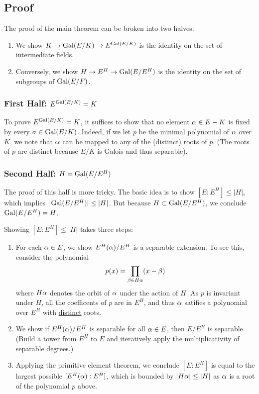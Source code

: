 \subsection{Proof}
The proof of the main theorem can be broken into two halves:
\begin{enumerate}
    \item We show $K \rightarrow \operatorname{Gal}(E/K) \rightarrow E^{\operatorname{Gal}(E/K)}$ is the identity on the set of intermediate fields.
    \item Conversely, we show $H \rightarrow E^H \rightarrow \operatorname{Gal}(E/E^H)$ is the identity on the set of subgroups of $\operatorname{Gal}(E/F)$.
\end{enumerate}

\subsubsection{First Half: $E^{\operatorname{Gal}(E/K)} = K$}
To prove $E^{\operatorname{Gal}(E/K)} = K$, it suffices to show that no element $\alpha \in E-K$ is fixed by every $\sigma \in \operatorname{Gal}(E/K)$. Indeed, if we let $p$ be the minimal polynomial of $\alpha$ over $K$, we note that $\alpha$ can be mapped to any of the (distinct) roots of $p$. (The roots of $p$ are distinct because $E/K$ is Galois and thus separable).

\subsubsection{Second Half: $H = \operatorname{Gal}(E/E^H)$}
The proof of this half is more tricky. The basic idea is to show $[E : E^H] \leq |H|$, which implies $|\operatorname{Gal}(E/E^H)| \leq |H|$. But because $H \subset \operatorname{Gal}(E/E^H)$, we conclude $\operatorname{Gal}(E/E^H) = H$.

Showing $[E : E^H] \leq |H|$ takes three steps:
\begin{enumerate}
    \item For each $\alpha \in E$, we show $E^H(\alpha)/E^H$ is a separable extension. To see this, consider the polynomial
        \[
            p(x) = \prod_{\beta \in H\alpha} (x - \beta)
        \]
        where $H\alpha$ denotes the orbit of $\alpha$ under the action of $H$. As $p$ is invariant under $H$, all the coefficents of $p$ are in $E^H$, and thus $\alpha$ satifies a polynomial over $E^H$ with \underline{distinct} roots.
    \item We show if $E^H(\alpha)/E^H$ is separable for all $\alpha \in E$, then $E/E^H$ is separable. (Build a tower from $E^H$ to $E$ and iteratively apply the multiplicativity of separable degrees.)
    \item Applying the primitive element theorem, we conclude $[E : E^H]$ is equal to the largest possible $[E^H(\alpha): E^H]$, which is bounded by $|H\alpha| \leq |H|$ as $\alpha$ is a root of the polynomial $p$ above.
\end{enumerate}

